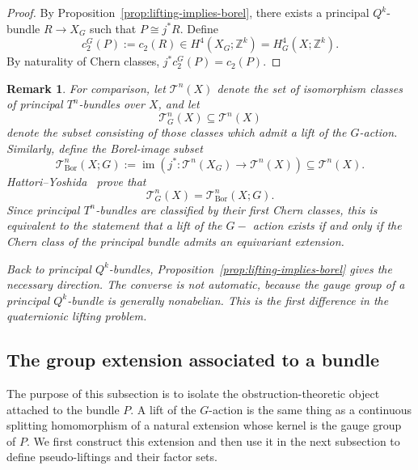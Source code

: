 \documentclass[11pt,a4paper]{article}
\numberwithin{equation}{section}
\newtheorem{remark}[definition]{Remark}
\theoremstyle{named}
\begin{document}
\begin{proof}
By Proposition~\ref{prop:lifting-implies-borel}, there exists a principal \(Q^k\)-bundle $R\longrightarrow X_G$
such that $P\cong j^*R$.
Define
\[
c_2^G(P):=c_2(R)\in H^4(X_G;\mathbb Z^k)=H_G^4(X;\mathbb Z^k).
\]
By naturality of Chern classes, $j^*c_2^G(P)=c_2(P)$.
\end{proof}

\begin{remark}
For comparison, let \(\mathcal T^n(X)\) denote the set of isomorphism classes of principal \(T^n\)-bundles over \(X\), and let \[ \mathcal T^n_G(X)\subseteq \mathcal T^n(X) \] denote the subset consisting of those classes which admit a lift of the \(G\)-action. Similarly, define the Borel-image subset \[\mathcal T^n_{\mathrm{Bor}}(X;G):=\operatorname{im}\left( j^*:\mathcal T^n(X_G)\longrightarrow \mathcal T^n(X)\right)\subseteq\mathcal T^n(X).\] Hattori--Yoshida~\cite[Theorem~1.1]{hatyos} prove that \[ \mathcal T^n_G(X) = \mathcal T^n_{\mathrm{Bor}}(X;G). \]
 Since principal \(T^n\)-bundles are classified by their first Chern classes, this is equivalent to the statement that a lift of the $G-$ action exists if and only if the Chern class of the principal bundle admits an equivariant extension.

Back to principal \(Q^k\)-bundles, Proposition~\ref{prop:lifting-implies-borel} gives the necessary direction. The converse is not automatic, because the gauge group of a principal \(Q^k\)-bundle is generally nonabelian. This is the first difference in the quaternionic lifting problem.
\end{remark}


\subsection{The group extension associated to a bundle}

The purpose of this subsection is to isolate the obstruction-theoretic object attached to the bundle \(P\). A lift of the \(G\)-action is the same thing as a continuous splitting homomorphism of a natural extension whose kernel is the gauge group of \(P\). We first construct this extension and then use it in the next subsection to define pseudo-liftings and their factor sets.
\end{document}
